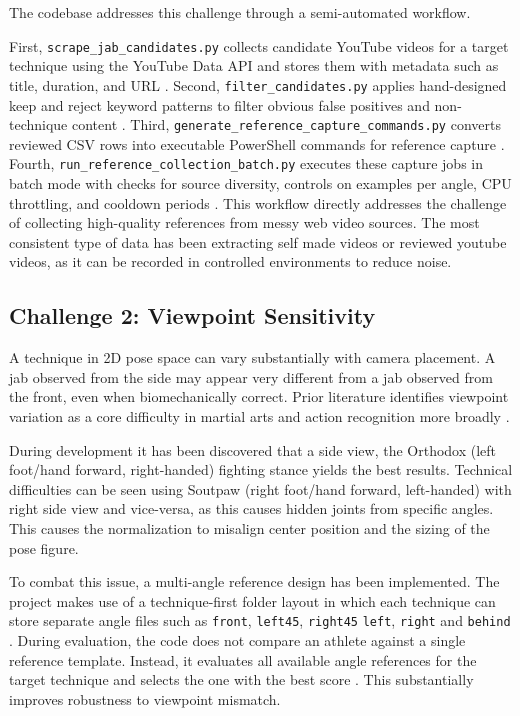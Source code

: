\documentclass[12pt]{article}
\begin{document}
The codebase addresses this challenge through a semi-automated workflow. 

First, \texttt{scrape\_jab\_candidates.py} collects candidate YouTube videos for a target technique using the YouTube Data API and stores them with metadata such as title, duration, and URL \cite{projectScrape}. Second, \texttt{filter\_candidates.py} applies hand-designed keep and reject keyword patterns to filter obvious false positives and non-technique content \cite{projectFilter}. Third, \texttt{generate\_reference\_capture\_commands.py} converts reviewed CSV rows into executable PowerShell commands for reference capture \cite{projectGenerate}. Fourth, \texttt{run\_reference\_collection\_batch.py} executes these capture jobs in batch mode with checks for source diversity, controls on examples per angle, CPU throttling, and cooldown periods \cite{projectRunBatch}. This workflow directly addresses the challenge of collecting high-quality references from messy web video sources.
The most consistent type of data has been extracting self made videos or reviewed youtube videos, as it can be recorded in controlled environments to reduce noise.

\subsection{Challenge 2: Viewpoint Sensitivity}
A technique in 2D pose space can vary substantially with camera placement. A jab observed from the side may appear very different from a jab observed from the front, even when biomechanically correct. Prior literature identifies viewpoint variation as a core difficulty in martial arts and action recognition more broadly \cite{wu2024sthka,echeverria2021pose}.

During development it has been discovered that a side view, the Orthodox (left foot/hand forward, right-handed) fighting stance yields the best results. Technical difficulties can be seen using Soutpaw (right foot/hand forward, left-handed) with right side view and vice-versa, as this causes hidden joints from specific angles. This causes the normalization to misalign center position and the sizing of the pose figure.

To combat this issue, a multi-angle reference design has been implemented. The project makes use of a technique-first folder layout in which each technique can store separate angle files such as \texttt{front}, \texttt{left45}, \texttt{right45} \texttt{left}, \texttt{right} and \texttt{behind }\cite{projectReadme}. During evaluation, the code does not compare an athlete against a single reference template. Instead, it evaluates all available angle references for the target technique and selects the one with the best score \cite{projectActionRecognition}. This substantially improves robustness to viewpoint mismatch.
\end{document}

